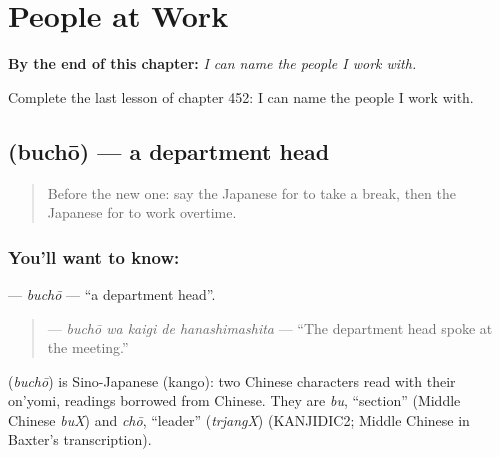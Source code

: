 
\chapter{People at Work}
\label{ch:ja-people-at-work}

\begin{chapteropening}
\textbf{By the end of this chapter:} \emph{I can name the people I work with.}

Complete the last lesson of chapter 452: I can name the people I work with.
\end{chapteropening}

\section[\texorpdfstring{\ja{ぶちょう} (buchō)}{ぶちょう (buchō)}]{ (buchō) — a department head}

\label{lesson:JA-C452-buchou}



\begin{quote}
Before the new one: say the Japanese for to take a break, then the Japanese for to work overtime.
\end{quote}

\subsection*{You'll want to know: }
\textbf{} — \emph{buchō} — \textquotedblleft{}a department head\textquotedblright{}.

\begin{quote}
\textbf{  } — \emph{buchō wa kaigi de hanashimashita} — \textquotedblleft{}The department head spoke at the meeting.\textquotedblright{}
\end{quote}

\begin{cousinweb}
\textbf{} (\emph{buchō}) is Sino-Japanese (kango): two Chinese characters read with their on'yomi, readings borrowed from Chinese. They are \emph{bu}, \textquotedblleft{}section\textquotedblright{} (Middle Chinese \emph{buX}) and \emph{chō}, \textquotedblleft{}leader\textquotedblright{} (\emph{trjangX}) (KANJIDIC2; Middle Chinese in Baxter's transcription).
\end{cousinweb}

